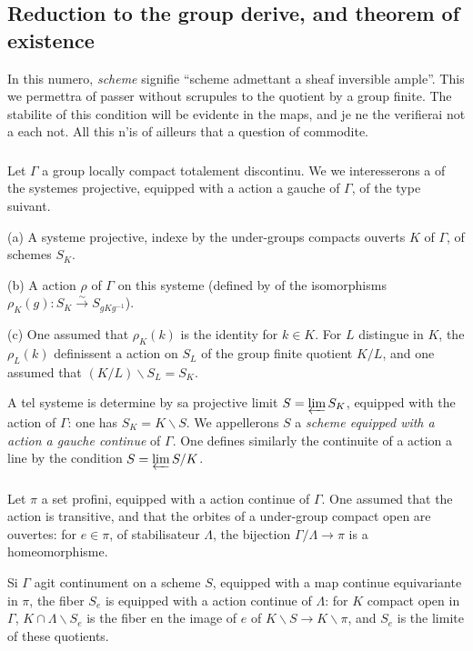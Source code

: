 \documentclass[12pt,a4paper]{article}
\theoremstyle{plain}
\theoremstyle{definition}
\theoremstyle{remark}
\begin{document}
\subsection{Reduction to the group derive, and theorem of existence}

In this numero, \textit{scheme} signifie ``scheme admettant a sheaf inversible ample''. This we permettra of passer without scrupules to the quotient by a group finite. The stabilite of this condition will be evidente in the maps, and je ne the verifierai not a each not. All this n'is of ailleurs that a question of commodite.

\subsubsection{}

Let $\Gamma$ a group locally compact totalement discontinu. We we interesserons a of the systemes projective, equipped with a action a gauche of $\Gamma$, of the type suivant.

(a) A systeme projective, indexe by the under-groups compacts ouverts $K$ of $\Gamma$, of schemes $S_K$.

(b) A action $\rho$ of $\Gamma$ on this systeme (defined by of the isomorphisms $\rho_K(g): S_K \xrightarrow{\sim} S_{gKg^{-1}}$).

(c) One assumed that $\rho_K(k)$ is the identity for $k \in K$. For $L$ distingue in $K$, the $\rho_L(k)$ definissent a action on $S_L$ of the group finite quotient $K/L$, and one assumed that $(K/L)\backslash S_L = S_K$.

A tel systeme is determine by sa projective limit $S = \varprojlim S_K$, equipped with the action of $\Gamma$: one has $S_K = K\backslash S$. We appellerons $S$ a \textit{scheme equipped with a action a gauche continue} of $\Gamma$. One defines similarly the continuite of a action a line by the condition $S = \varprojlim S/K$.

\subsubsection{}

Let $\pi$ a set profini, equipped with a action continue of $\Gamma$. One assumed that the action is transitive, and that the orbites of a under-group compact open are ouvertes: for $e \in \pi$, of stabilisateur $\Lambda$, the bijection $\Gamma/\Lambda \to \pi$ is a homeomorphisme.

Si $\Gamma$ agit continument on a scheme $S$, equipped with a map continue equivariante in $\pi$, the fiber $S_e$ is equipped with a action continue of $\Lambda$: for $K$ compact open in $\Gamma$, $K \cap \Lambda\backslash S_e$ is the fiber en the image of $e$ of $K\backslash S \to K\backslash\pi$, and $S_e$ is the limite of these quotients.
\end{document}
